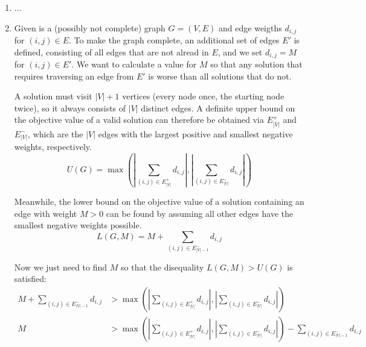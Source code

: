 \documentclass{scrartcl}
\begin{document}
	\begin{enumerate}
		\item ...
		\item Given is a (possibly not complete) graph $G=(V,E)$ and edge weigths $d_{i,j}$ for $(i,j) \in E$. To make the graph complete, an additional set of edges $E'$ is defined, consisting of all edges that are not alread in $E$, and we set $d_{i,j} = M$ for $(i,j) \in E'$. We want to calculate a value for $M$ so that any solution that requires traversing an edge from $E'$ is worse than all solutions that do not.
		
		A solution must visit $|V| + 1$ vertices (every node once, the starting node twice), so it always consists of $|V|$ distinct edges. A definite upper bound on the objective value of a valid solution can therefore be obtained via $E_{|V|}^+$ and $E_{|V|}^-$, which are the $|V|$ edges with the largest positive and smallest negative weights, respectively.
		\[ U(G) = \max\left( \left| \sum_{(i,j) \in E_{|V|}^+}{d_{i,j}} \right|, \left| \sum_{(i,j) \in E_{|V|}^-}{d_{i,j}} \right| \right) \]
		
		Meanwhile, the lower bound on the objective value of a solution containing an edge with weight $M > 0$ can be found by assuming all other edges have the smallest negative weights possible.
		\[ L(G,M) = M + \sum_{(i,j) \in E_{|V|-1}^-}{d_{i,j}} \]
		
		Now we just need to find $M$ so that the disequality $L(G,M) > U(G)$ is satisfied:
		\begin{align*}
			M + \sum_{(i,j) \in E_{|V|-1}^-}{d_{i,j}} &> \max\left( \left| \sum_{(i,j) \in E_{|V|}^+}{d_{i,j}} \right|, \left| \sum_{(i,j) \in E_{|V|}^-}{d_{i,j}} \right| \right)\\
			M &> \max\left( \left| \sum_{(i,j) \in E_{|V|}^+}{d_{i,j}} \right|, \left| \sum_{(i,j) \in E_{|V|}^-}{d_{i,j}} \right| \right) - \sum_{(i,j) \in E_{|V|-1}^-}{d_{i,j}}
		\end{align*}
	\end{enumerate}
\end{document}
